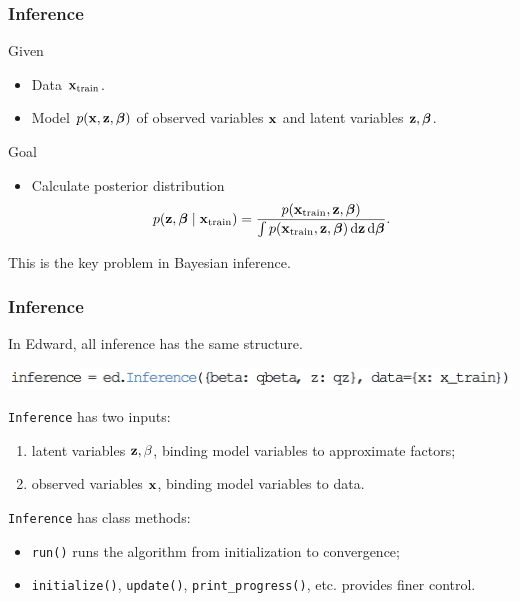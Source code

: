 \documentclass[10pt,
               xcolor={usenames,dvipsnames},
               hyperref={colorlinks,linktoc=all,citecolor=Plum,linkcolor=MidnightBlue,urlcolor=MidnightBlue},noamssymb]{beamer}
\begin{document}
\begin{frame}
\frametitle{Inference}
Given
\begin{itemize}
\item Data $\boldsymbol{\mathbf{x}}_{\text{train}}$.
\item
Model $p(\boldsymbol{\mathbf{x}}, \boldsymbol{\mathbf{z}}, \boldsymbol{\mathbf{\beta}})$ of
observed variables $\boldsymbol{\mathbf{x}}$ and latent variables $\boldsymbol{\mathbf{z}}, \boldsymbol{\mathbf{\beta}}$.
\end{itemize}
Goal
\begin{itemize}
\item
Calculate posterior distribution
\begin{equation*}
p(\boldsymbol{\mathbf{z}}, \boldsymbol{\mathbf{\beta}}\mid\boldsymbol{\mathbf{x}}_{\text{train}}) =
\frac{p(\boldsymbol{\mathbf{x}}_{\text{train}}, \boldsymbol{\mathbf{z}}, \boldsymbol{\mathbf{\beta}})}{\int
p(\boldsymbol{\mathbf{x}}_{\text{train}}, \boldsymbol{\mathbf{z}}, \boldsymbol{\mathbf{\beta}}) \operatorname{d}\!{\boldsymbol{\mathbf{z}}}\operatorname{d}\!{\boldsymbol{\mathbf{\beta}}}}.
\end{equation*}
\end{itemize}
\vspace{2ex}
This is the key problem in Bayesian inference.
\end{frame}

\begin{frame}
\frametitle{Inference}

In Edward, all inference has the same structure.

\begin{center}
\vspace{-2.0ex}
\includegraphics[height=0.05\textheight]{img/inference.png}
\end{center}

\texttt{Inference} has two inputs: \\
\begin{enumerate}
\vspace{-3ex}
\item
latent variables $\boldsymbol{\mathbf{z}},\beta$, binding model variables to approximate factors;
\item
observed variables $\boldsymbol{\mathbf{x}}$, binding model variables to data.
\end{enumerate}

\texttt{Inference} has class methods:
\begin{itemize}
\item
\texttt{run()} runs the algorithm from initialization to convergence;
\item
\texttt{initialize()}, \texttt{update()}, \texttt{print\_progress()}, etc.
provides finer control.
\end{itemize}
\end{frame}
\end{document}
